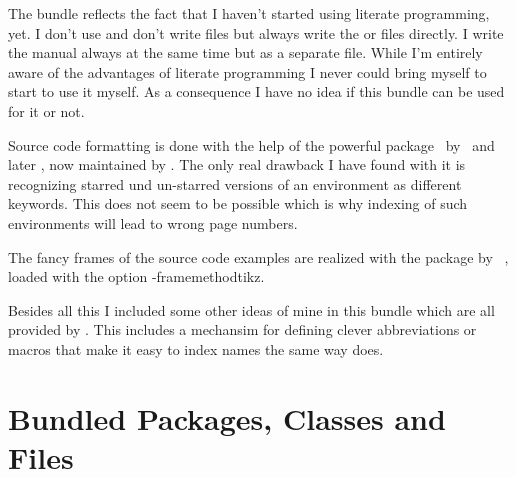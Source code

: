 \documentclass[load-preamble+]{cnltx-doc}
\newcommand*\file[1]{\code{#1}}
\begin{document}
The bundle reflects the fact that I haven't started using literate
programming, yet.  I don't use  and don't write \file{dtx}
files but always write the \file{sty} or  files directly.  I write
the manual always at the same time but as a separate file.  While I'm entirely
aware of the advantages of literate programming I never could bring myself to
start to use it myself.  As a consequence I have no idea if this bundle can be
used for it or not.

Source code formatting is done with the help of the powerful
 package~\cite{pkg:listings} by \heinz\ and later \moses, now
maintained by \hoffmann.  The only real drawback I have found with it is
recognizing starred und un-starred versions of an environment as different
keywords.  This does not seem to be possible which is why indexing of such
environments will lead to wrong page numbers.

The fancy frames of the source code examples are realized with the
 package by \daniel~\cite{pkg:mdframed}, loaded with the option
\keyis*-{framemethod}{tikz}.

Besides all this I included some other ideas of mine in this bundle which are
all provided by \cnltxtools.  This includes a mechansim for defining clever
abbreviations or macros that make it easy to index names the same way
 does.


\section{Bundled Packages, Classes and Files}
\end{document}
